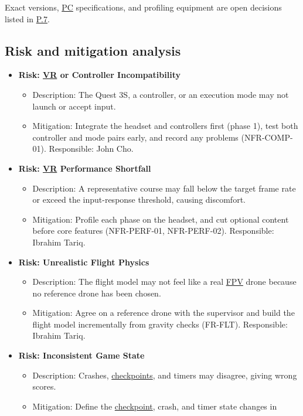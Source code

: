 \documentclass[12pt]{article}
\begin{document}
Exact versions, \hyperlink{glos:PCVR}{PC} specifications, and profiling equipment are open
decisions listed in \hyperref[p7]{P.7}.

\subsection{Risk and mitigation analysis}\label{p6}


\begin{itemize}
\item \textbf{Risk: \hyperlink{glos:VR}{VR} or Controller Incompatibility}
  \begin{itemize}
  \item Description: The Quest 3S, a controller, or an execution mode may
  not launch or accept input.
  \item Mitigation: Integrate the headset and controllers first (phase 1),
  test both controller and mode pairs early, and record any problems
  (NFR-COMP-01). Responsible: John Cho.
  \end{itemize}
\item \textbf{Risk: \hyperlink{glos:VR}{VR} Performance Shortfall}
  \begin{itemize}
  \item Description: A representative course may fall below the target frame
  rate or exceed the input-response threshold, causing discomfort.
  \item Mitigation: Profile each phase on the headset, and cut optional
  content before core features (NFR-PERF-01, NFR-PERF-02). Responsible:
  Ibrahim Tariq.
  \end{itemize}
\item \textbf{Risk: Unrealistic Flight Physics}
  \begin{itemize}
  \item Description: The flight model may not feel like a real \hyperlink{glos:FPV}{FPV} drone
  because no reference drone has been chosen.
  \item Mitigation: Agree on a reference drone with the supervisor and build
  the flight model incrementally from gravity checks (FR-FLT).
  Responsible: Ibrahim Tariq.
  \end{itemize}
\item \textbf{Risk: Inconsistent Game State}
  \begin{itemize}
  \item Description: Crashes, \hyperlink{glos:Checkpoint}{checkpoints}, and timers may disagree, giving
  wrong scores.
  \item Mitigation: Define the \hyperlink{glos:Checkpoint}{checkpoint}, crash, and timer state changes in

\end{itemize}
\end{itemize}
\end{document}
